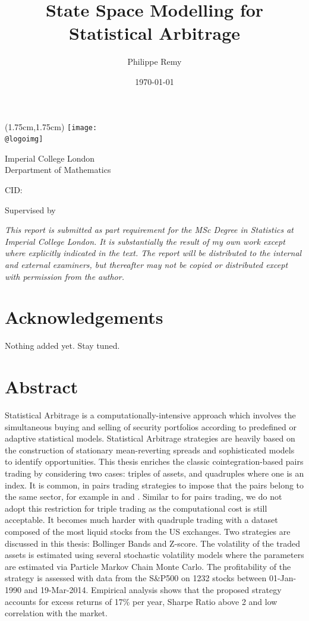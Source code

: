 \documentclass[11pt,a4,twosided,singlespacing,titlepagenumber=on]{scrreprt}
\title{State Space Modelling for Statistical Arbitrage}
\author{Philippe Remy}
\date{\today}
\makeatletter
\numberwithin{equation}{chapter} %
\theoremstyle{remark}
\renewcommand{\maketitle}{
\begin{titlepage}
\ifdefined\@logoimg
\begin{textblock*}{8cm}(1.75cm,1.75cm)
\texttt{[image: \\@logoimg]}
\end{textblock*}
\vspace*{1cm}
\else
\fi
\begin{center}
\vspace*{\stretch{0.1}}
Imperial College London\\
Derpartment of Mathematics\par
\vspace*{\stretch{1}} %
{\titlefont\Huge \@title\par} %
\vspace*{\stretch{2}}
{\Large \@author \par}
\vspace*{1em}
{\large CID: \@CID \par}
\vspace*{\stretch{0.5}}
{\large Supervised by \@supervisor \par}
\vspace*{\stretch{3}}
\@date
\vspace*{\stretch{1}}

\end{center}%
\textit{
This report is submitted as part requirement for the MSc Degree in Statistics at Imperial College London. It is substantially the result of my own work except where explicitly indicated in the text. The report will be distributed to the internal and external examiners, but thereafter may not be copied or distributed except with permission from the author.}
\vspace*{\stretch{0.1}}
\end{titlepage}%
}
\renewenvironment{abstract}%
{\chapter*{Abstract}\thispagestyle{plain}}%
{\clearpage}
\makeatother
\begin{document}


\maketitle

\renewcommand{\contentsname}{Table of Contents}
\tableofcontents

\listoffigures
\listoftables


\chapter*{Acknowledgements}
Nothing added yet. Stay tuned.

\begin{abstract}
Statistical Arbitrage is a computationally-intensive approach which involves the simultaneous buying and selling of security portfolios according to predefined or adaptive statistical models. Statistical Arbitrage strategies are heavily based on the construction of stationary mean-reverting spreads and sophisticated models to identify opportunities. This thesis enriches the classic cointegration-based pairs trading by considering two cases: triples of assets, and quadruples where one is an index. It is common, in pairs trading strategies to impose that the pairs belong to the same sector, for example in \cite{chan2009} and \cite{dunis2010}. Similar to \cite{caldeira2013} for pairs trading, we do not adopt this restriction for triple trading as the computational cost is still acceptable. It becomes much harder with quadruple trading with a dataset composed of the most liquid stocks from the US exchanges. Two strategies are discussed in this thesis: Bollinger Bands and Z-score. The volatility of the traded assets is estimated using several stochastic volatility models where the parameters are estimated via Particle Markov Chain Monte Carlo. The profitability of the strategy is assessed with data from the S\&P500 on 1232 stocks between 01-Jan-1990 and 19-Mar-2014. Empirical analysis shows that the proposed strategy accounts for excess returns of 17\% per year, Sharpe Ratio above 2 and low correlation with the market.

\end{abstract}
\newpage



\end{document}
